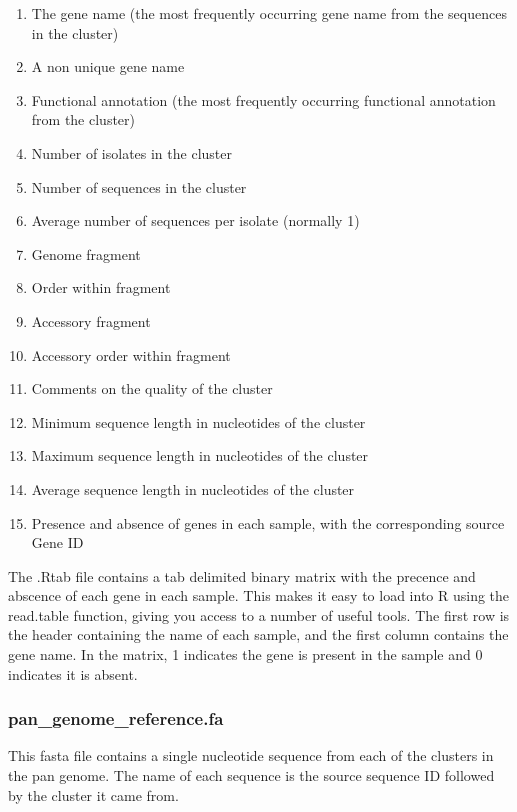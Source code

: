\documentclass[11pt]{article}
\providecommand{\tightlist}{%
      \setlength{\itemsep}{0pt}\setlength{\parskip}{0pt}}
\begin{document}
\begin{enumerate}
\def\labelenumi{\arabic{enumi}.}
\tightlist
\item
  The gene name (the most frequently occurring gene name from the
  sequences in the cluster)
\item
  A non unique gene name
\item
  Functional annotation (the most frequently occurring functional
  annotation from the cluster)
\item
  Number of isolates in the cluster
\item
  Number of sequences in the cluster
\item
  Average number of sequences per isolate (normally 1)
\item
  Genome fragment
\item
  Order within fragment
\item
  Accessory fragment
\item
  Accessory order within fragment
\item
  Comments on the quality of the cluster
\item
  Minimum sequence length in nucleotides of the cluster
\item
  Maximum sequence length in nucleotides of the cluster
\item
  Average sequence length in nucleotides of the cluster
\item
  Presence and absence of genes in each sample, with the corresponding
  source Gene ID
\end{enumerate}

The .Rtab file contains a tab delimited binary matrix with the precence
and abscence of each gene in each sample. This makes it easy to load
into R using the read.table function, giving you access to a number of
useful tools. The first row is the header containing the name of each
sample, and the first column contains the gene name. In the matrix, 1
indicates the gene is present in the sample and 0 indicates it is
absent.

\hypertarget{pan_genome_reference.fa}{%
\subsubsection{pan\_genome\_reference.fa}\label{pan_genome_reference.fa}}

This fasta file contains a single nucleotide sequence from each of the
clusters in the pan genome. The name of each sequence is the source
sequence ID followed by the cluster it came from.
\end{document}
